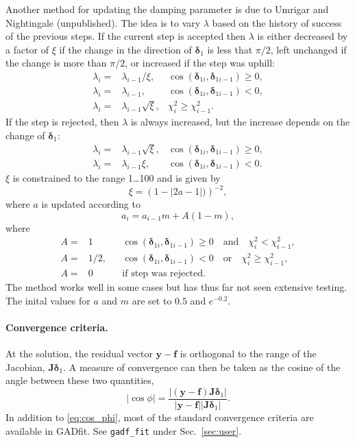 \documentclass{article}
\begin{document}
Another method for updating the damping parameter is due to Umrigar and Nightingale (unpublished). The idea is to vary $\lambda$ based on the history of success of the previous steps. If the current step is accepted then $\lambda$ is either decreased by a factor of $\xi$ if the change in the direction of $\bm\delta_1$ is less that $\pi/2$, left unchanged if the change is more than $\pi/2$, or increased if the step was uphill:
\begin{align}
  \label{eq:umnigh_lambda_acc}
  \lambda_i =& \lambda_{i-1}/\xi, 
  & \cos(\bm\delta_{1i},\bm\delta_{1i-1}) \ge 0, \\
  \lambda_i =& \lambda_{i-1}, & \cos(\bm\delta_{1i},\bm\delta_{1i-1})
                                < 0, \\
  \lambda_i =& \lambda_{i-1}\sqrt{\xi}, & \chi_i^2 \ge \chi_{i-1}^2.
\end{align}
If the step is rejected, then $\lambda$ is always increased, but the
increase depends on the change of $\bm\delta_1$:
\begin{align}
  \label{eq:umnigh_lambda_rej}
  \lambda_i =& \lambda_{i-1}\sqrt{\xi}, 
  & \cos(\bm\delta_{1i},\bm\delta_{1i-1}) \ge 0, \\
  \lambda_i =& \lambda_{i-1}\xi, & \cos(\bm\delta_{1i},\bm\delta_{1i-1})
                                   < 0.
\end{align}
$\xi$ is constrained to the range 1\ldots100 and is given by
\begin{equation}
  \label{eq:umnigh_xi}
  \xi = \left( 1-|2a-1|) \right)^{-2},
\end{equation}
where $a$ is updated according to
\begin{equation}
  \label{eq:umnigh_a_update}
  a_i = a_{i-1}m + A(1-m),
\end{equation}
where
\begin{align}
  \label{eq:umnigh_A_update}
  A =& 1 && \cos(\bm\delta_{1i},\bm\delta_{1i-1}) \ge 0 \quad
            \text{and} \quad \chi_i^2 < \chi_{i-1}^2, \\
  A =& 1/2, && \cos(\bm\delta_{1i},\bm\delta_{1i-1})
               < 0 \quad \text{or} \quad \chi_i^2 \ge \chi_{i-1}^2, \\
  A =& 0 && \text{if step was rejected}.
\end{align}
The method works well in some cases but has thus far not seen extensive testing. The inital values for $a$ and $m$ are set to $0.5$ and $e^{-0.2}$.

\paragraph{Convergence criteria.} At the solution, the residual vector $\bm y - \bm f$ is orthogonal to the range of the Jacobian, $\bm J\bm\delta_1$. A measure of convergence can then be taken as the cosine of the angle between these two quantities,
\begin{equation}
  \label{eq:cos_phi}
  |\cos\phi| = \frac{|(\bm y - \bm f) \bm J\bm \delta_1|}{|\bm y - \bm
    f||\bm J\bm \delta_1|}.
\end{equation}
In addition to \eqref{eq:cos_phi}, most of the standard convergence criteria are available in GADfit. See \verb+gadf_fit+ under Sec.~\ref{sec:user}.
\end{document}
